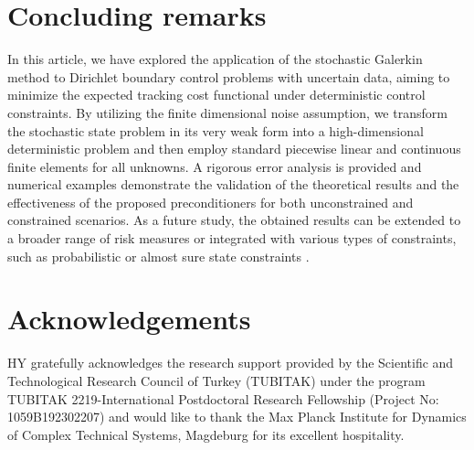 \documentclass[a4paper,10pt]{article}
\numberwithin{theorem}{section}
\begin{document}


\section{Concluding remarks}\label{sec:conclusion} 

In this article, we have explored the application of the stochastic Galerkin method to Dirichlet boundary control problems with uncertain data, aiming to minimize the expected tracking cost functional under deterministic control constraints. By utilizing the finite dimensional noise assumption, we transform the stochastic state problem in its very weak form into a high-dimensional deterministic problem and then employ standard piecewise linear and continuous finite elements for all unknowns. A rigorous error analysis is provided and  numerical examples demonstrate the validation of the theoretical results and the effectiveness of the proposed preconditioners for both unconstrained and constrained scenarios. As a future study, the obtained results can be extended to a broader range of risk measures \cite{JORoysets_2022,RTRockafellar_JORoyset_2015} or integrated with various types of constraints, such as probabilistic or almost sure state constraints \cite{CGeiersbach_RHenrion_PPerezAros_2025,DPKouri_MStaudigl_TMSurowiec_2023}.


\section*{Acknowledgements}
HY gratefully acknowledges the research support provided by the Scientific and Technological Research Council of Turkey (TUBITAK) under the program TUBITAK 2219-International Postdoctoral Research Fellowship (Project No: 1059B192302207) and would like to thank the Max Planck Institute for Dynamics of Complex Technical Systems, Magdeburg for its excellent hospitality. 




\end{document}
